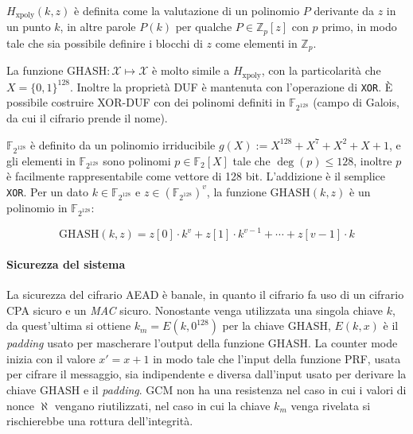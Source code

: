 $H_{\text{xpoly}}(k,z)$ è definita come la valutazione di un polinomio $P$ derivante da $z$ in un punto $k$, in altre parole $P(k)$ per qualche $P \in \mathbb{Z}_{p}[z]$ con $p$ primo, in modo tale che sia possibile definire i blocchi di $z$ come elementi in $\mathbb{Z}_p$. 

La funzione GHASH$: \mathcal{X} \mapsto \mathcal{X}$ è molto simile a $H_{\text{xpoly}}$, con la particolarità che $X = \{0,1\}^{128}$. Inoltre la proprietà DUF è mantenuta con l'operazione di \texttt{XOR}. È possibile costruire XOR-DUF con dei polinomi definiti in $\mathbb{F}_{2^{128}}$ (campo di Galois, da cui il cifrario prende il nome). 

\vspace{1em}\noindent
$\mathbb{F}_{2^{128}}$ è definito da un polinomio irriducibile $g(X) := X^{128} + X^7 + X^2 + X + 1$, e gli elementi in $\mathbb{F}_{2^{128}}$ sono polinomi $p \in \mathbb{F}_{2}[X]$ tale che $\deg{(p)} \leq 128$, inoltre $p$ è facilmente rappresentabile come vettore di 128 bit. L'addizione è il semplice \texttt{XOR}. Per un dato $k  \in \mathbb{F}_{2^{128}}$ e $z \in {(\mathbb{F}_{2^{128}})}^v$, la funzione GHASH$(k,z)$ è un polinomio in $\mathbb{F}_{2^{128}}$:

\begin{equation*}
    \text{GHASH}(k,z) = z[0]\cdot k^v + z[1] \cdot k^{v-1} +  \cdots + z[v-1]\cdot k
\end{equation*}

\paragraph{Sicurezza del sistema}
La sicurezza del cifrario AEAD è banale, in quanto il cifrario fa uso di un cifrario CPA sicuro e un \emph{MAC} sicuro. Nonostante venga utilizzata una singola chiave $k$, da quest'ultima si ottiene $k_m = E(k,0^{128})$ per la chiave GHASH, $E(k,x)$ è il \emph{padding} usato per mascherare l'output della funzione GHASH. La counter mode inizia con il valore $x' = x + 1$ in modo tale che l'input della funzione PRF, usata per cifrare il messaggio, sia indipendente e diversa dall'input usato per derivare la chiave GHASH e il \emph{padding}. GCM non ha una resistenza nel caso in cui i valori di nonce $\aleph$ vengano riutilizzati, nel caso in cui la chiave $k_m$ venga rivelata si rischierebbe una rottura dell'integrità.

